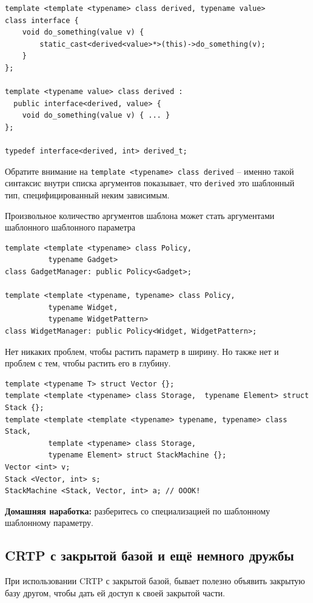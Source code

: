 \documentclass[a4paper,12pt,oneside]{book}
\begin{document}
\begin{lstlisting}
template <template <typename> class derived, typename value> 
class interface {
    void do_something(value v) {
        static_cast<derived<value>*>(this)->do_something(v);
    }
};

template <typename value> class derived : 
  public interface<derived, value> {
    void do_something(value v) { ... }
};

typedef interface<derived, int> derived_t;
\end{lstlisting}

Обратите внимание на \lstinline!template <typename> class derived! -- именно такой синтаксис внутри списка аргументов показывает, что \lstinline!derived! это шаблонный тип, специфицированный неким зависимым.

Произвольное количество аргументов шаблона может стать аргументами шаблонного шаблонного параметра

\begin{lstlisting}
template <template <typename> class Policy,
          typename Gadget>
class GadgetManager: public Policy<Gadget>;

template <template <typename, typename> class Policy,
          typename Widget, 
          typename WidgetPattern>
class WidgetManager: public Policy<Widget, WidgetPattern>;
\end{lstlisting}

Нет никаких проблем, чтобы растить параметр в ширину. Но также нет и проблем с тем, чтобы растить его в глубину.

\begin{lstlisting}
template <typename T> struct Vector {};
template <template <typename> class Storage,  typename Element> struct Stack {};
template <template <template <typename> typename, typename> class Stack, 
          template <typename> class Storage, 
          typename Element> struct StackMachine {};
Vector <int> v;
Stack <Vector, int> s;
StackMachine <Stack, Vector, int> a; // OOOK!
\end{lstlisting}

\textbf{Домашняя наработка:} разберитесь со специализацией по шаблонному шаблонному параметру.

\subsection{CRTP с закрытой базой и ещё немного дружбы}\label{ClosedCRTP}

При использовании CRTP с закрытой базой, бывает полезно объявить закрытую базу другом, чтобы дать ей доступ к своей закрытой части.
\end{document}
